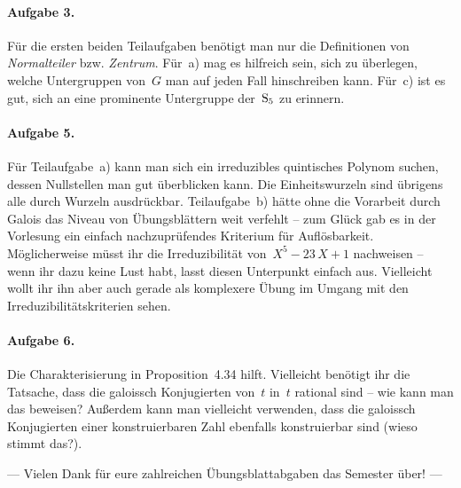 \documentclass{../algblatt}
\begin{document}
\paragraph{Aufgabe 3.} Für die ersten beiden Teilaufgaben benötigt man nur die
Definitionen von \emph{Normalteiler} bzw. \emph{Zentrum}. Für~a) mag es
hilfreich sein, sich zu überlegen, welche Untergruppen von~$G$ man auf jeden
Fall hinschreiben kann. Für~c) ist es gut, sich an eine prominente
Untergruppe der~$\mathrm{S}_5$ zu erinnern.

\paragraph{Aufgabe 5.} Für Teilaufgabe~a) kann man sich ein
irreduzibles quintisches Polynom suchen, dessen Nullstellen man gut überblicken
kann. Die Einheitswurzeln sind übrigens alle durch Wurzeln ausdrückbar.
Teilaufgabe~b) hätte
ohne die Vorarbeit durch Galois das Niveau von Übungsblättern weit verfehlt --
zum Glück gab es in der Vorlesung ein einfach nachzuprüfendes Kriterium für
Auflösbarkeit. Möglicherweise müsst ihr die Irreduzibilität von~$X^5-23\,X+1$
nachweisen -- wenn ihr dazu keine Lust habt, lasst diesen Unterpunkt einfach
aus. Vielleicht wollt ihr ihn aber auch gerade als komplexere Übung im
Umgang mit den Irreduzibilitätskriterien sehen.

\paragraph{Aufgabe 6.} Die Charakterisierung in Proposition~4.34 hilft.
Vielleicht benötigt ihr die Tatsache, dass die galoissch Konjugierten von~$t$
in~$t$ rational sind -- wie kann man das beweisen? Außerdem kann man vielleicht
verwenden, dass die galoissch Konjugierten einer konstruierbaren Zahl ebenfalls
konstruierbar sind (wieso stimmt das?).

\begin{center}
--- Vielen Dank für eure zahlreichen Übungsblattabgaben das Semester über! ---
\end{center}
\end{document}
